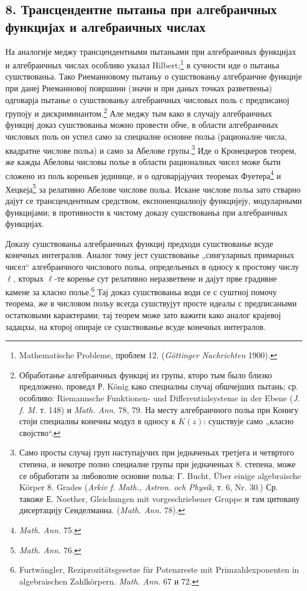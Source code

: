 ﻿\documentclass[11pt]{article}
\begin{document}
\subsection*{8. Трансцендентне пытаньа при алгебраичных функцијах и алгебраичных числах}
На аналогије меджу трансцендентными пытаньами при алгебраичных функцијах и алгебраичных числах особливо указал Hilbert;\footnote{Mathematische Probleme, проблем 12. (\emph{Göttinger Nachrichten} 1900).} в сучности иде о пытаньа сушствованьа. Тако Риеманновому пытаньу о сушствованьу алгебраичне функције при данеј Риеманновој површини (значи и при даных точках разветвеньа) одговарја пытанье о сушствованьу алгебраичных числовых поль с предписаној групоју и дискриминантом.\footnote{Обработанье алгебраичных функциј из групы, кторо тым было близко предложено, проведл Р. König како специалны случај обшчејших пытань; ср. особливо: Riemannsche Funktionen- und Differentialsysteme in der Ebene (\emph{J. f. M.} т. 148) и \emph{Math. Ann.} 78, 79. На месту алгебраичного польа при Конигу стоји специалны конечны модул в односу к \(K(z)\): сушствује само „класно својство“.} Але меджу тым како в случају алгебраичных функциј доказ сушствованьа можно провести обче, в области алгебраичных числовых поль он успел само за специалне основне польа (рационалне числа, квадратне числове польа) и само за Абелове групы.\footnote{Само просты случај груп наступајучих при једначеньах третјега и четвртого степена, и некотре полно специалне групы при једначеньах 8. степена, може се обработати за либоволне основне польа: Г. Bucht, Über einige algebraische Körper 8. Grades (\emph{Arkiv f. Math., Astron. och Physik}, т. 6, Nr. 30.) Ср. такоже Е. Noether, Gleichungen mit vorgeschriebener Gruppe и там цитовану дисертацију Сеиделманна. (\emph{Math. Ann.} 78).} Иде о Кронецкеров теорем, же кажды Абеловы числовы полье в области рационалных чисел може быти сложено из поль кореньев јединице, и о одговарјајучих теоремах Фуетера\footnote{\emph{Math. Ann.} 75.} и Хецкеја\footnote{\emph{Math. Ann.} 76.} за релативно Абелове числове польа. Искане числове польа зато стварно дајут се трансцендентным средством, експоненциалноју функцијеју, модуларными функцијами; в противности к чистому доказу сушствованьа при алгебраичных функцијах.

Доказу сушствованьа алгебраичных функциј предходи сушствованье всуде конечных интегралов. Аналог тому јест сушствованье „сингуларных примарных чисел“ алгебраичного числового польа, определьеных в односу к простому числу \(\ell\), кторых \(\ell\)-те коренье сут релативно неразветвене и дајут прве градивне камене за класно полье.\footnote{Furtwängler, Reziprozitätsgesetze für Potenzreste mit Primzahlexponenten in algebraischen Zahlkörpern. \emph{Math. Ann.} 67 и 72.} Тај доказ сушствованьа води се с суштној помочу теорема, же в числовом польу всегда сушствујут просте идеалы с предписаными остатковыми карактерами; тај теорем може зато важити како аналог крајевој задацхы, на кторој опираје се сушствованье всуде конечных интегралов.
\end{document}
